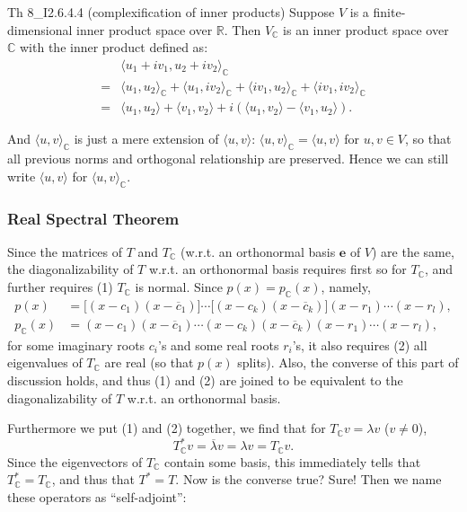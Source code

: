 \documentclass{article}
\begin{document}
\begin{Th}{Th 8\_I2.6.4.4 (complexification of inner products)}
    Suppose $V$ is a finite-dimensional inner product space over $\mathbb{R}$. Then $V_{\mathbb{C}}$ is an inner product space over $\mathbb{C}$ with the inner product defined as:
    $$ 
    \begin{aligned}
        & \langle u_1+iv_1, u_2+iv_2\rangle _{\mathbb{C}} \\
        =& \langle u_1, u_2\rangle _{\mathbb{C}} + \langle u_1, iv_2\rangle _{\mathbb{C}} + \langle iv_1, u_2\rangle _{\mathbb{C}} + \langle iv_1, iv_2\rangle _{\mathbb{C}} \\
        =& \langle u_1, u_2\rangle + \langle v_1, v_2\rangle + i\left(\langle u_1, v_2\rangle - \langle v_1, u_2\rangle\right).
    \end{aligned}
    $$
\end{Th}

And $\langle u,v \rangle _{\mathbb{C}}$ is just a mere extension of $\langle u,v \rangle$: $\langle u,v \rangle _{\mathbb{C}} = \langle u,v \rangle$ for $u, v\in V$, so that all previous norms and orthogonal relationship are preserved. \textcolor{Df}{Hence we can still write $\langle u,v \rangle$ for $\langle u,v \rangle _{\mathbb{C}}$}.

\subsubsection{Real Spectral Theorem}
Since the matrices of $T$ and $T_{\mathbb{C}}$ (w.r.t. an orthonormal basis $\pmb{e}$ of $V$) are the same, the diagonalizability of $T$ w.r.t. an orthonormal basis requires first so for $T_{\mathbb{C}}$, and further requires (1) $T_{\mathbb{C}}$ is normal. Since $p(x) = p_{\mathbb{C}}(x)$, namely, 
$$ 
\begin{aligned}
    p(x) &= \Big[(x-c_1)(x-\overline{c}_1)\Big]\cdots\Big[(x-c_k)(x-\overline{c}_k)\Big](x-r_1)\cdots(x-r_l), \\
    p_{\mathbb{C}}(x) &= (x-c_1)(x-\overline{c}_1)\cdots(x-c_k)(x-\overline{c}_k)(x-r_1)\cdots(x-r_l),
\end{aligned}
$$
for some imaginary roots $c_i$'s and some real roots $r_i$'s, it also requires (2) all eigenvalues of $T_{\mathbb{C}}$ are real (so that $p(x)$ splits). Also, the converse of this part of discussion holds, and thus (1) and (2) are joined to be equivalent to the diagonalizability of $T$ w.r.t. an orthonormal basis.

Furthermore we put (1) and (2) together, we find that for $T_\mathbb{C}v = \lambda v$ ($v\neq 0$),
$$ T_\mathbb{C}^\ast v = \overline{\lambda} v = \lambda v = T_\mathbb{C}v. $$
Since the eigenvectors of $T_\mathbb{C}$ contain some basis, this immediately tells that $T^\ast_\mathbb{C} = T_\mathbb{C}$, and thus that $T^\ast = T$. Now is the converse true? Sure! Then we name these operators as ``self-adjoint'':
\end{document}
